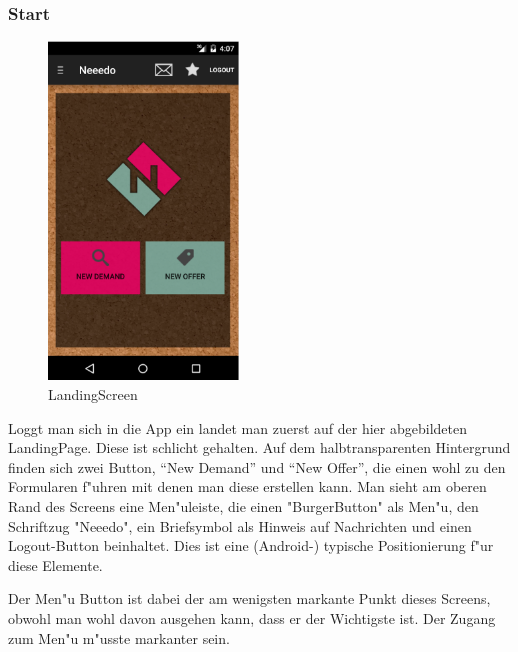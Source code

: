 \subsubsection{Start}
\begin{figure}[H]
\begin{center}
\includegraphics[width=0.45\textwidth]{./Bilder/start.png}
\caption{LandingScreen}
\label{fig:start}
\end{center}
\end{figure}

Loggt man sich in die App ein landet man zuerst auf der hier abgebildeten LandingPage. 
Diese ist schlicht gehalten.
Auf dem halbtransparenten Hintergrund finden sich zwei Button, \enquote{New Demand} und \enquote{New Offer}, die einen wohl zu den Formularen f"uhren mit denen man diese erstellen kann.
Man sieht am oberen Rand des Screens eine Men"uleiste, die einen "BurgerButton" als Men"u, den Schriftzug "Neeedo", ein Briefsymbol als Hinweis auf Nachrichten und einen Logout-Button beinhaltet. 
Dies ist eine (Android-) typische Positionierung f"ur diese  Elemente. 

Der Men"u Button ist dabei der am wenigsten markante Punkt dieses Screens, obwohl man wohl davon ausgehen kann, dass er der Wichtigste ist. 
Der Zugang zum Men"u m"usste markanter sein.

